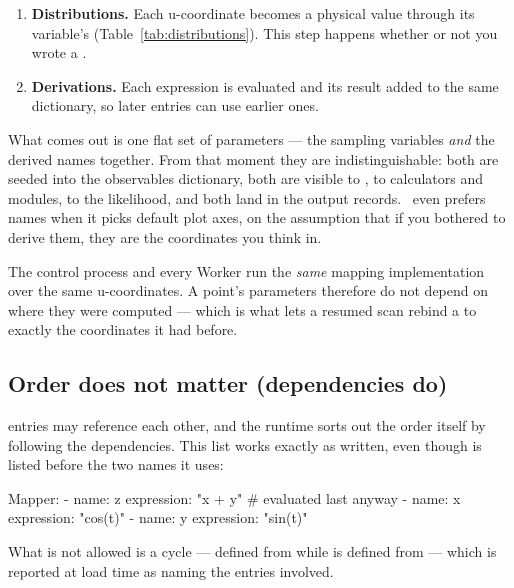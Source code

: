 \begin{enumerate}[leftmargin=1.6em]
  \item \textbf{Distributions.} Each u-coordinate becomes a physical value through its
        variable's  (Table~\ref{tab:distributions}). This step
        happens whether or not you wrote a .
  \item \textbf{Derivations.} Each  expression is evaluated and its
        result added to the same dictionary, so later entries can use earlier ones.
\end{enumerate}

What comes out is one flat set of parameters --- the sampling variables \emph{and} the
derived names together. From that moment they are indistinguishable: both are seeded into
the observables dictionary, both are visible to , to calculators and
 modules, to the likelihood, and both land in the output records.
\JPlot\ even prefers  names when it picks default plot axes, on the
assumption that if you bothered to derive them, they are the coordinates you think in.

\begin{jnote}
The control process and every Worker run the \emph{same} mapping implementation over the
same u-coordinates. A point's parameters therefore do not depend on where they were
computed --- which is what lets a resumed scan rebind a  to exactly the
coordinates it had before.
\end{jnote}

\subsection{Order does not matter (dependencies do)}

 entries may reference each other, and the runtime sorts out the order
itself by following the dependencies. This list works exactly as written, even though
 is listed before the two names it uses:

\begin{yamlwin}
Mapper:
  - name: z
    expression: "x + y"    # evaluated last anyway
  - name: x
    expression: "cos(t)"
  - name: y
    expression: "sin(t)"
\end{yamlwin}

What is not allowed is a cycle ---  defined from  while  is
defined from  --- which is reported at load time as  naming the
entries involved.

